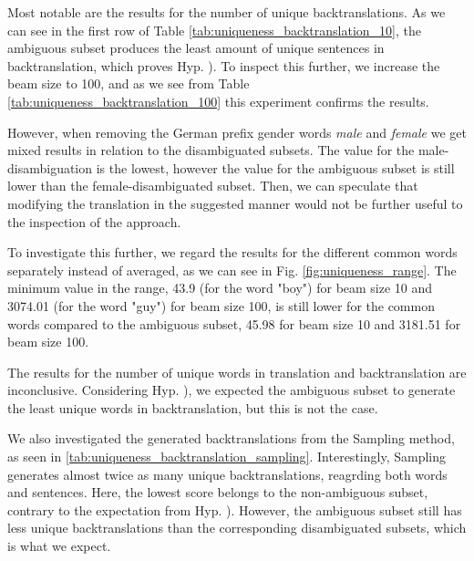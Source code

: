 Most notable are the results for the number of unique backtranslations. As we can see in the first row of Table \ref{tab:uniqueness_backtranslation_10}, the ambiguous subset produces the least amount of unique sentences in backtranslation, which proves Hyp. ). To inspect this further, we increase the beam size to 100, and as we see from Table \ref{tab:uniqueness_backtranslation_100} this experiment confirms the results.

However, when removing the German prefix gender words \textit{male} and \textit{female} we get mixed results in relation to the disambiguated subsets. The value for the male-disambiguation is the lowest, however the value for the ambiguous subset is still lower than the female-disambiguated subset. Then, we can speculate that modifying the translation in the suggested manner would not be further useful to the inspection of the approach.

To investigate this further, we regard the results for the different common words separately instead of averaged, as we can see in Fig. \ref{fig:uniqueness_range}. The minimum value in the range, 43.9 (for the word "boy") for beam size 10 and 3074.01 (for the word "guy") for beam size 100, is still lower for the common words compared to the ambiguous subset, 45.98 for beam size 10 and 3181.51 for beam size 100.

The results for the number of unique words in translation and backtranslation are inconclusive. Considering Hyp. ), we expected the ambiguous subset to generate the least unique words in backtranslation, but this is not the case.

We also investigated the generated backtranslations from the Sampling method, as seen in \ref{tab:uniqueness_backtranslation_sampling}. Interestingly, Sampling generates almost twice as many unique backtranslations, reagrding both words and sentences. Here, the lowest score belongs to the non-ambiguous subset, contrary to the expectation from Hyp. ). However, the ambiguous subset still has less unique backtranslations than the corresponding disambiguated subsets, which is what we expect.

